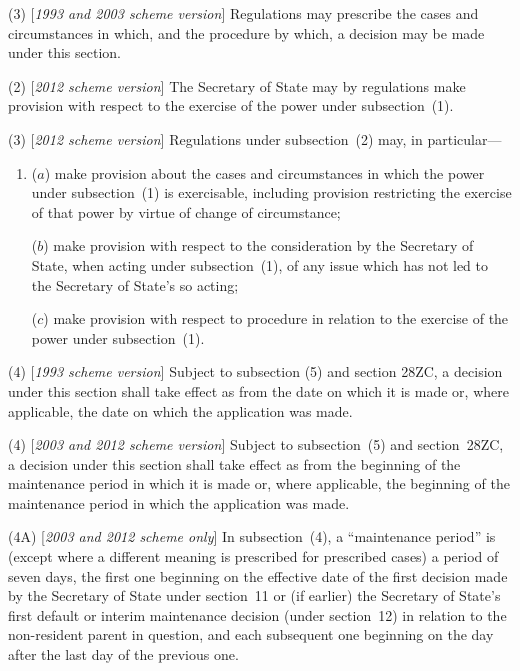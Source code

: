 \documentclass[12pt,a4paper]{article}
\begin{document}
(3) [\emph{1993 and 2003 scheme version}] Regulations may prescribe the cases and circumstances in which, and the procedure by which, a decision may be made under this section.

(2) [\emph{2012 scheme version}] The Secretary of State may by regulations make provision with respect to the exercise of the power under subsection~(1).

(3) [\emph{2012 scheme version}] Regulations under subsection~(2) may, in particular—
\begin{enumerate}\item[]
($a$) make provision about the cases and circumstances in which the power under subsection~(1) is exercisable, including provision restricting the exercise of that power by virtue of change of circumstance;

($b$) make provision with respect to the consideration by the Secretary of State, when acting under subsection~(1), of any issue which has not led to the Secretary of State's so acting;

($c$) make provision with respect to procedure in relation to the exercise of the power under subsection~(1).
\end{enumerate}

(4) [\emph{1993 scheme version}] Subject to subsection (5) and section 28ZC, a decision under this section shall take effect as from the date on which it is made or, where applicable, the date on which the application was made.

(4) [\emph{2003 and 2012 scheme version}] Subject to subsection~(5)  and section~28ZC, a decision under this section shall take effect as from the beginning of the maintenance period in which it is made or, where applicable, the beginning of the maintenance period in which the application was made.

(4A) [\emph{2003 and 2012 scheme only}] In subsection~(4), a “maintenance period” is (except where a different meaning is prescribed for prescribed cases) a period of seven days, the first one beginning on the effective date of the first decision made by the 
Secretary of State  %
under section~11 or (if earlier) 
the Secretary of State's  %
first default or interim maintenance decision (under section~12) in relation to the non-resident parent in question, and each subsequent one beginning on the day after the last day of the previous one.
\end{document}
